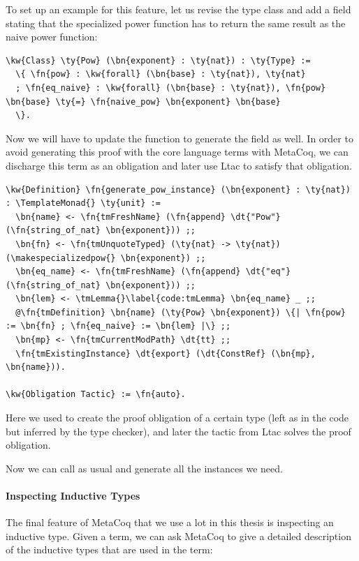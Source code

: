 To set up an example for this feature, let us revise the  type class and add a field stating that the specialized power function has to return the same result as the naive power function:

\begin{Verbatim}
\kw{Class} \ty{Pow} (\bn{exponent} : \ty{nat}) : \ty{Type} :=
  \{ \fn{pow} : \kw{forall} (\bn{base} : \ty{nat}), \ty{nat}
  ; \fn{eq_naive} : \kw{forall} (\bn{base} : \ty{nat}), \fn{pow} \bn{base} \ty{=} \fn{naive_pow} \bn{exponent} \bn{base}
  \}.
\end{Verbatim}

Now we will have to update the \generatepowinstance{} function to generate the  field as well. In order to avoid generating this proof with the core language terms with MetaCoq, we can discharge this term as an obligation and later use \gls{Ltac} to satisfy that obligation.

\newcommand{\tmLemma}{\hyperref[code:tmLemma]{\fn{tmLemma}}}
\begin{Verbatim}
\kw{Definition} \fn{generate_pow_instance} (\bn{exponent} : \ty{nat}) : \TemplateMonad{} \ty{unit} :=
  \bn{name} <- \fn{tmFreshName} (\fn{append} \dt{"Pow"} (\fn{string_of_nat} \bn{exponent})) ;;
  \bn{fn} <- \fn{tmUnquoteTyped} (\ty{nat} -> \ty{nat}) (\makespecializedpow{} \bn{exponent}) ;;
  \bn{eq_name} <- \fn{tmFreshName} (\fn{append} \dt{"eq"} (\fn{string_of_nat} \bn{exponent})) ;;
  \bn{lem} <- \tmLemma{}\label{code:tmLemma} \bn{eq_name} _ ;;
  @\fn{tmDefinition} \bn{name} (\ty{Pow} \bn{exponent}) \{| \fn{pow} := \bn{fn} ; \fn{eq_naive} := \bn{lem} |\} ;;
  \bn{mp} <- \fn{tmCurrentModPath} \dt{tt} ;;
  \fn{tmExistingInstance} \dt{export} (\dt{ConstRef} (\bn{mp}, \bn{name})).

\kw{Obligation Tactic} := \fn{auto}.
\end{Verbatim}

Here we used \tmLemma{} to create the proof obligation of a certain type (left as \code{\_} in the code but inferred by the type checker), and later the  tactic from \gls{Ltac} solves the proof obligation.

Now we can call \generatepowinstances{} as usual and generate all the  instances we need.

\paragraph*{Inspecting Inductive Types}

The final feature of MetaCoq that we use a lot in this thesis is inspecting an inductive type. Given a term, we can ask MetaCoq to give a detailed description of the inductive types that are used in the term:


